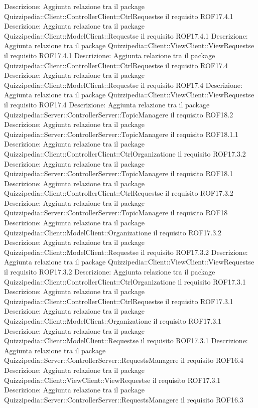 Descrizione: Aggiunta relazione tra il package Quizzipedia::Client::ControllerClient::CtrlRequestse il requisito ROF17.4.1 
Descrizione: Aggiunta relazione tra il package Quizzipedia::Client::ModelClient::Requestse il requisito ROF17.4.1 
Descrizione: Aggiunta relazione tra il package Quizzipedia::Client::ViewClient::ViewRequestse il requisito ROF17.4.1 
Descrizione: Aggiunta relazione tra il package Quizzipedia::Client::ControllerClient::CtrlRequestse il requisito ROF17.4 
Descrizione: Aggiunta relazione tra il package Quizzipedia::Client::ModelClient::Requestse il requisito ROF17.4 
Descrizione: Aggiunta relazione tra il package Quizzipedia::Client::ViewClient::ViewRequestse il requisito ROF17.4 
Descrizione: Aggiunta relazione tra il package Quizzipedia::Server::ControllerServer::TopicManagere il requisito ROF18.2 
Descrizione: Aggiunta relazione tra il package Quizzipedia::Server::ControllerServer::TopicManagere il requisito ROF18.1.1 
Descrizione: Aggiunta relazione tra il package Quizzipedia::Client::ControllerClient::CtrlOrganizatione il requisito ROF17.3.2 
Descrizione: Aggiunta relazione tra il package Quizzipedia::Server::ControllerServer::TopicManagere il requisito ROF18.1 
Descrizione: Aggiunta relazione tra il package Quizzipedia::Client::ControllerClient::CtrlRequestse il requisito ROF17.3.2 
Descrizione: Aggiunta relazione tra il package Quizzipedia::Server::ControllerServer::TopicManagere il requisito ROF18 
Descrizione: Aggiunta relazione tra il package Quizzipedia::Client::ModelClient::Organizatione il requisito ROF17.3.2 
Descrizione: Aggiunta relazione tra il package Quizzipedia::Client::ModelClient::Requestse il requisito ROF17.3.2 
Descrizione: Aggiunta relazione tra il package Quizzipedia::Client::ViewClient::ViewRequestse il requisito ROF17.3.2 
Descrizione: Aggiunta relazione tra il package Quizzipedia::Client::ControllerClient::CtrlOrganizatione il requisito ROF17.3.1 
Descrizione: Aggiunta relazione tra il package Quizzipedia::Client::ControllerClient::CtrlRequestse il requisito ROF17.3.1 
Descrizione: Aggiunta relazione tra il package Quizzipedia::Client::ModelClient::Organizatione il requisito ROF17.3.1 
Descrizione: Aggiunta relazione tra il package Quizzipedia::Client::ModelClient::Requestse il requisito ROF17.3.1 
Descrizione: Aggiunta relazione tra il package Quizzipedia::Server::ControllerServer::RequestsManagere il requisito ROF16.4 
Descrizione: Aggiunta relazione tra il package Quizzipedia::Client::ViewClient::ViewRequestse il requisito ROF17.3.1 
Descrizione: Aggiunta relazione tra il package Quizzipedia::Server::ControllerServer::RequestsManagere il requisito ROF16.3 
